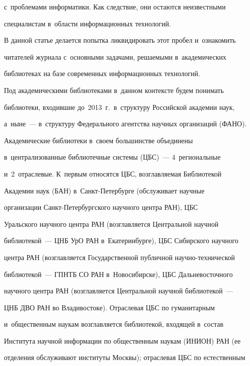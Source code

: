 с~проблемами информатики. Как следствие, они остаются неизвестными 


специалистам в~области информационных технологий. 


  


  В данной статье делается попытка ликвидировать этот пробел и~ознакомить 


читателей журнала с~основными задачами, решаемыми в~академических 


библиотеках на базе современных информационных технологий. 


  


  Под академическими библиотеками в~данном контексте будем понимать 


биб\-лио\-те\-ки, входившие до~2013~г.\ в~структуру Российской академии наук, 


а~ныне~--- в~структуру Федерального агентства научных организаций (ФАНО). 


  


  Академические библиотеки в~своем большинстве объединены 


в~централизованные библиотечные системы (ЦБС)~--- 4~региональные 


и~2~отраслевые. К~первым относятся ЦБС, возглавляемая Библиотекой 


Академии наук (БАН) в~Санкт-Пе\-тер\-бур\-ге (обслуживает научные 


организации Санкт-Пе\-тер\-бург\-ско\-го научного центра РАН), ЦБС 


Уральского научного центра РАН (возглавляется Центральной научной 


библиотекой~--- ЦНБ УрО РАН в~Екатеринбурге), ЦБС Сибирского научного 


центра РАН (возглавляется Государственной публичной на\-уч\-но-тех\-ни\-че\-ской 


библиотекой~--- ГПНТБ СО РАН в~Новосибирске), ЦБС Дальневосточного 


научного центра РАН (возглавляется Центральной научной библиотекой~--- 


ЦНБ ДВО РАН во Владивостоке). Отраслевая ЦБС по гуманитарным 


и~общественным наукам возглавляется библиотекой, входящей в~состав 


Института научной информации по общественным наукам (ИНИОН) РАН (ее 


отделения обслуживают институты Москвы); отраслевая ЦБС по естественным 


